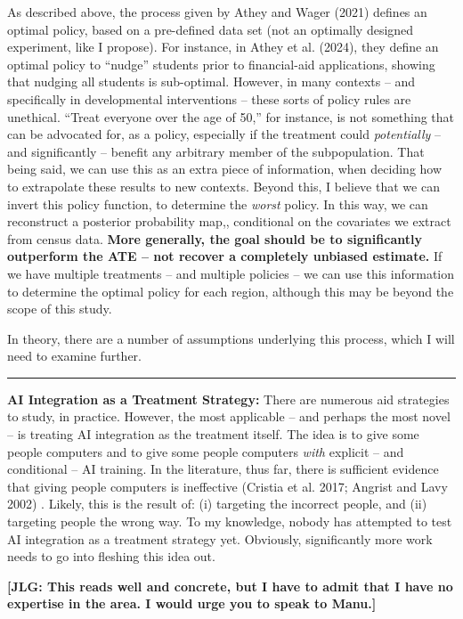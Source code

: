 \documentclass[12pt,letterpaper,doublespace, oneside]{article}
\begin{document}
As described above, the process given by Athey and Wager (2021) \cite{Athey2021} defines an optimal policy, based on a pre-defined data set (not an optimally designed experiment, like I propose). For instance, in Athey et al. (2024), they define an optimal policy to \enquote{nudge} students prior to financial-aid applications, showing that nudging all students is sub-optimal. However, in many contexts -- and specifically in developmental interventions -- these sorts of policy rules are unethical. \enquote{Treat everyone over the age of 50,} for instance, is not something that can be advocated for, as a policy, especially if the treatment could \emph{potentially} -- and significantly -- benefit any arbitrary member of the subpopulation. That being said, we can use this as an extra piece of information, when deciding how to extrapolate these results to new contexts. Beyond this, I believe that we can invert this policy function, to determine the \emph{worst} policy. In this way, we can reconstruct a  posterior probability map,, conditional on the covariates we extract from census data. \textbf{More generally, the goal should be to significantly outperform the ATE -- not recover a completely unbiased estimate.} If we have multiple treatments -- and multiple policies -- we can use this information to determine the optimal policy for each region, although this may be beyond the scope of this study. 

In theory, there are a number of assumptions underlying this process, which I will need to examine further. 

\noindent\rule{\linewidth}{0.4pt}

\noindent\textbf{AI Integration as a Treatment Strategy:} 
There are numerous aid strategies to study, in practice. However, the most applicable -- and perhaps the most novel -- is treating AI integration as the treatment itself. The idea is to give some people computers and to give some people computers \emph{with} explicit -- and conditional -- AI training. In the literature, thus far, there is sufficient evidence that giving people computers is ineffective (Cristia et al. 2017; Angrist and Lavy 2002) \cite{Cristia2017} \cite{Angrist2002}. Likely, this is the result of: (i) targeting the incorrect people, and (ii) targeting people the wrong way. To my knowledge, nobody has attempted to test AI integration as a treatment strategy yet. Obviously, significantly more work needs to go into fleshing this idea out.


\bigskip

\noindent \textbf{[JLG: This reads well and concrete, but I have to admit that I have no expertise in the area. I would urge you to speak to Manu.]}
\end{document}
